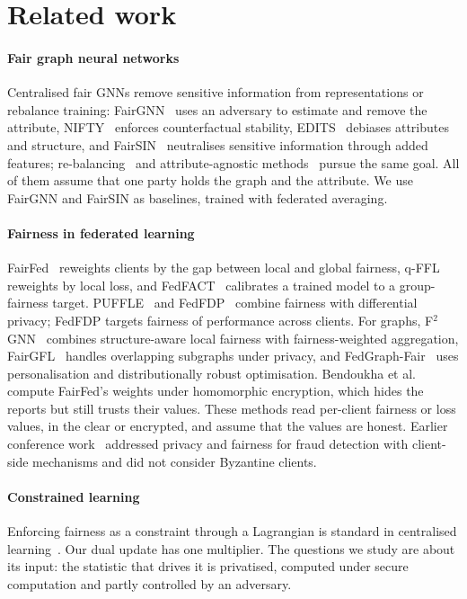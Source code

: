 \section{Related work}\label{sec:related}

\paragraph{Fair graph neural networks}
Centralised fair GNNs remove sensitive information from representations or rebalance training: FairGNN~\citep{dai2021say} uses an adversary to estimate and remove the attribute, NIFTY~\citep{agarwal2021towards} enforces counterfactual stability, EDITS~\citep{dong2022edits} debiases attributes and structure, and FairSIN~\citep{yang2024fairsin} neutralises sensitive information through added features; re-balancing~\citep{li2024fairgb} and attribute-agnostic methods~\citep{zhu2024fairinv} pursue the same goal. All of them assume that one party holds the graph and the attribute. We use FairGNN and FairSIN as baselines, trained with federated averaging.

\paragraph{Fairness in federated learning}
FairFed~\citep{ezzeldin2023fairfed} reweights clients by the gap between local and global fairness, q-FFL~\citep{li2020fair} reweights by local loss, and FedFACT~\citep{fedfact2025} calibrates a trained model to a group-fairness target. PUFFLE~\citep{corbucci2024puffle} and FedFDP~\citep{ling2024feddp} combine fairness with differential privacy; FedFDP targets fairness of performance across clients. For graphs, F$^2$GNN~\citep{f2gnn2023} combines structure-aware local fairness with fairness-weighted aggregation, FairGFL~\citep{fairgfl2026} handles overlapping subgraphs under privacy, and FedGraph-Fair~\citep{fedgraphfair2026} uses personalisation and distributionally robust optimisation. Bendoukha et al.~\citep{bendoukha2025popets} compute FairFed's weights under homomorphic encryption, which hides the reports but still trusts their values. These methods read per-client fairness or loss values, in the clear or encrypted, and assume that the values are honest. Earlier conference work~\citep{dang2026fedfairgnn} addressed privacy and fairness for fraud detection with client-side mechanisms and did not consider Byzantine clients.

\paragraph{Constrained learning}
Enforcing fairness as a constraint through a Lagrangian is standard in centralised learning~\citep{cotter2019optimization}. Our dual update has one multiplier. The questions we study are about its input: the statistic that drives it is privatised, computed under secure computation and partly controlled by an adversary.

